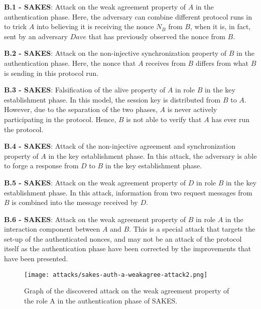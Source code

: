 \begin{list}{•}{}

\item \textbf{B.1 - SAKES}: Attack on the weak agreement property of $A$ in the authentication phase. Here, the adversary can combine different protocol runs in to trick $A$ into believing it is receiving the nonce $N_B$ from $B$, when it is, in fact, sent by an adversary $Dave$ that has previously observed the nonce from $B$.

\item \textbf{B.2 - SAKES}: Attack on the non-injective synchronization property of $B$ in the authentication phase. Here, the nonce that $A$ receives from $B$ differs from what $B$ is sending in this protocol run.

\item \textbf{B.3 - SAKES}: Falsification of the alive property of $A$ in role $B$ in the key establishment phase. In this model, the session key is distributed from $B$ to $A$. However, due to the separation of the two phases, $A$ is never actively participating in the protocol. Hence, $B$ is not able to verify that $A$ has ever run the protocol.

\item \textbf{B.4 - SAKES}: Attack of the non-injective agreement and synchronization property of $A$ in the key establishment phase. In this attack, the adversary is able to forge a response from $D$ to $B$ in the key establishment phase.

\item \textbf{B.5 - SAKES}: Attack on the weak agreement property of $D$ in role $B$ in the key establishment phase. In this attack, information from two request messages from $B$ is combined into the message received by $D$.

\item \textbf{B.6 - SAKES}: Attack on the weak agreement property of $B$ in role $A$ in the interaction component between $A$ and $B$. This is a special attack that targets the set-up of the authenticated nonces, and may not be an attack of the protocol itself as the authentication phase have been corrected by the improvements that have been presented.

\end{list}


\begin{sidewaysfigure}
	\centering
	\texttt{[image: attacks/sakes-auth-a-weakagree-attack2.png]}
	\caption{Graph of the discovered attack on the weak agreement property of the role A in the authentication phase of SAKES.}
	\label{fig:sakes-attack-weakagree}
\end{sidewaysfigure}

